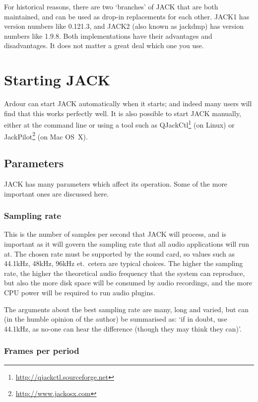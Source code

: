 \documentclass[10pt,a4paper]{book}
\begin{document}
For historical reasons, there are two `branches' of JACK that are both
maintained, and can be used as drop-in replacements for each other.
JACK1 has version numbers like 0.121.3, and JACK2 (also known as
jackdmp) has version numbers like 1.9.8.  Both implementations have
their advantages and disadvantages.  It does not matter a great deal
which one you use.



\section{Starting JACK}

Ardour can start JACK automatically when it starts; and indeed many
users will find that this works perfectly well.  It is also possible
to start JACK manually, either at the command line or using a tool
such as QJackCtl\footnote{\url{http://qjackctl.sourceforge.net}} (on
Linux) or JackPilot\footnote{\url{http://www.jackosx.com}} (on Mac
OS~X).

\subsection{Parameters}

JACK has many parameters which affect its operation.  Some of the more
important ones are discussed here.

\subsubsection{Sampling rate}

This is the number of samples per second that JACK will process, and
is important as it will govern the sampling rate that all audio
applications will run at.  The chosen rate must be supported
by the sound card, so values such as 44.1kHz, 48kHz, 96kHz
et.\ cetera are typical choices.  The higher the sampling rate, the
higher the theoretical audio frequency that the system can reproduce,
but also the more disk space will be consumed by audio recordings, and
the more CPU power will be required to run audio plugins.

The arguments about the best sampling rate are many, long and varied,
but can (in the humble opinion of the author) be summarised as: `if in
doubt, use 44.1kHz, as no-one can hear the difference (though they
may think they can)'.

\subsubsection{Frames per period}
\end{document}
